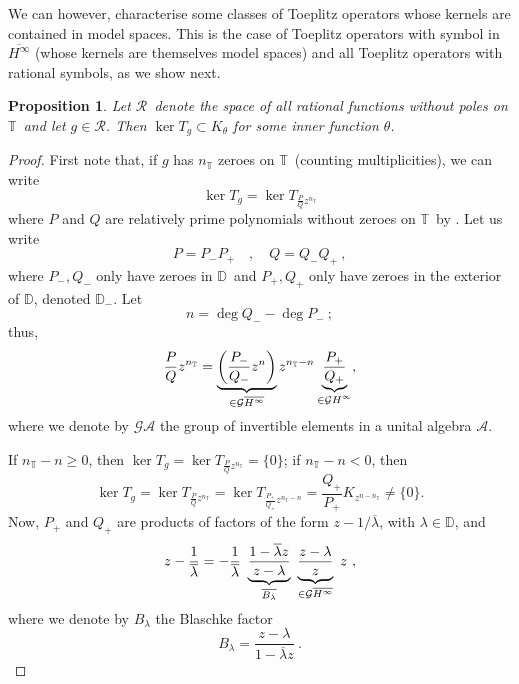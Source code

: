 \documentclass{article}
\numberwithin{equation}{section}
\theoremstyle{plain}
\newtheorem{prop}[thm]{Proposition}
\newcommand{\Hinf}{\ensuremath{H^\infty}}
\newcommand{\TT}{\ensuremath{\mathbb{T}}}
\newcommand{\DD}{\ensuremath{\mathbb{D}}}
\renewcommand{\AA}{\ensuremath{\mathcal{A}}}
\newcommand{\GG}{\ensuremath{\mathcal{G}}}
\newcommand{\RR}{\ensuremath{\mathcal{R}}}
\newcommand{\ol}[1]{\ensuremath{\overline{#1}}}
\newcommand{\annot}[2]{\underbrace{#1}_{\smash[b]{\scriptstyle #2}}}
\newcommand{\zero}{\ensuremath{\{0\}}}
\newcommand{\kertg}{\ensuremath{\ker T_g}}
\begin{document}
We can however, characterise some classes of Toeplitz operators whose kernels are contained in model spaces.
This is the case of Toeplitz operators with symbol in $\ol\Hinf$ (whose kernels are themselves model spaces) and all Toeplitz operators with rational symbols, as we show next.


\begin{prop}
\label{prop:rational_symbol_contained_model_space}
Let \RR\ denote the space of all rational functions without poles on \TT\ and let $g\in\RR$.
Then $\kertg\subset K_\theta$ for some inner function $\theta$.
\end{prop}

\begin{proof}
First note that, if $g$ has $n_\TT$ zeroes on \TT\ (counting multiplicities), we can write
\begin{equation}
\kertg = \ker T_{\frac{P}{Q}z^{n_\TT}}
\end{equation}
where $P$ and $Q$ are relatively prime polynomials without zeroes on \TT\ by \cite[Corollary 6.3]{CP24}.
Let us write
\begin{equation}
P = P_- P_+ \quad , \quad Q = Q_- Q_+ \ ,
\end{equation}
where $P_-,Q_-$ only have zeroes in \DD\ and $P_+,Q_+$ only have zeroes in the exterior of \DD, denoted $\DD_-$.
Let
\begin{equation}
\label{eq:n_def}
n = \deg Q_- - \deg P_- \ ;
\end{equation}
thus,
\begin{equation}
\frac{P}{Q}z^{n_\TT} = \annot{
\left( \frac{P_-}{Q_-}z^n \right)}{\in\GG\ol\Hinf}
z^{n_\TT - n} \annot{
\frac{P_+}{Q_+}}{\in\GG\Hinf},
\end{equation}
where we denote by $\GG\AA$ the group of invertible elements in a unital algebra \AA.


If $n_\TT - n \geq 0$, then $\kertg = \ker T_{\frac{P}{Q}z^{n_\TT}} = \zero$;
if $n_\TT - n < 0$, then
\begin{equation}
\kertg = \ker T_{\frac{P}{Q}z^{n_\TT}} = \ker T_{\frac{P_+}{Q_+}z^{n_\TT -n}} = \frac{Q_+}{P_+} K_{z^{n - n_\TT}} \neq\zero.
\end{equation}
Now, $P_+$ and $Q_+$ are products of factors of the form $z - 1/ \ol\lambda$, with $\lambda \in \DD$, and
\begin{equation}
z-\frac{1}{\ol\lambda} = - \frac{1}{\ol\lambda} \ 
\annot{\frac{1-\ol\lambda z}{z-\lambda}}{\ol{B_\lambda}} \ 
\annot{\frac{z-\lambda}{z}}{\in\GG\ol\Hinf} \ 
z \ ,
\end{equation}
where we denote by $B_\lambda$ the Blaschke factor
\begin{equation}
B_\lambda = \frac{z-\lambda}{1 - \ol\lambda z}\ .
\end{equation}


\end{proof}
\end{document}
